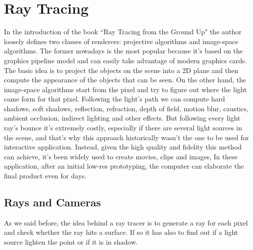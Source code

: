 
\section{Ray Tracing}

In the introduction of the book ``Ray Tracing from the Ground Up"\cite{rt_groundup} the author loosely defines two classes of renderers: projective algorithms and image-space algorithms.
The former nowadays is the most popular because it's based on the graphics pipeline model and can easily take advantage of modern graphics cards.
The basic idea is to project the objects on the scene into a 2D plane and then compute the appearance of the objects that can be seen.
On the other hand, the image-space algorithms start from the pixel and try %
to figure out where the light came form for that pixel.
Following the light's path we can compute hard shadows, soft shadows, reflection, refraction,
 depth of field, motion blur, caustics, ambient occlusion, indirect lighting and other effects.
But following every light ray's bounce it's extremely costly, especially if there are several light sources in the scene, and that's why this approach historically wasn't the one to be used for interactive application.
Instead, given the high quality and fidelity this method can achieve, it's been widely used to create movies, clips and images,
In these application, after an initial low-res prototyping, the computer can elaborate the final product even for days.




\subsection{Rays and Cameras}
As we said before, the idea behind a ray tracer is to generate a ray for each pixel and check whether the ray hits a surface.
If so it has also to find out if a light source lighten the point or if it is in shadow.

